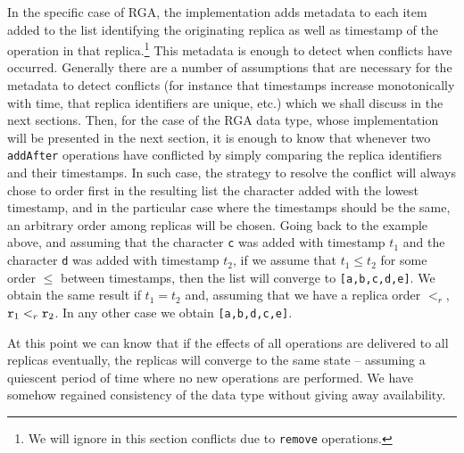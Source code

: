 
In the specific case of RGA, the implementation adds metadata to each
item added to the list identifying the originating replica as well as
timestamp of the operation in that replica.\footnote{We will ignore in
  this section conflicts due to \lstinline|remove| operations.}
%
This metadata is enough to detect when conflicts have occurred.
%
Generally there are a number of assumptions that are necessary for the
metadata to detect conflicts (for instance that timestamps increase
monotonically with time, that replica identifiers are unique, etc.)
which we shall discuss in the next sections.
%
Then, for the case of the RGA data type, whose implementation will be
presented in the next section, it is enough to know that whenever
two \lstinline|addAfter| operations have conflicted by simply
comparing the replica identifiers and their timestamps.
%
In such case, the strategy to resolve the conflict will always chose
to order first in the resulting list the character added with the
lowest timestamp, and in the particular case where the timestamps
should be the same, an arbitrary order among replicas will be chosen.
%
Going back to the example above, and assuming that the character
\lstinline|c| was added with timestamp $t_1$ and the character
\lstinline|d| was added with timestamp $t_2$, if we assume that $t_1 \leq
t_2$ for some order $\leq$ between timestamps, then the list will
converge to \lstinline|[a,b,c,d,e]|.
%
We obtain the same result if $t_1 = t_2$ and, assuming that we have a replica
order $<_r$, $\mathtt{r}_1 <_r \mathtt{r}_2$.
%
In any other case we obtain \lstinline|[a,b,d,c,e]|.

At this point we can know that if the effects of all operations are
delivered to all replicas eventually, the replicas will converge to
the same state -- assuming a quiescent period of time where no new
operations are performed.
%
We have somehow regained consistency of the data type without
giving away availability.

